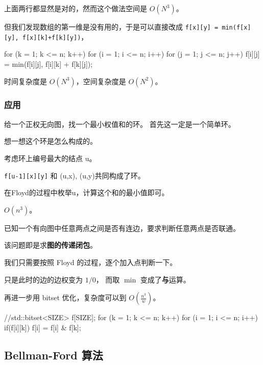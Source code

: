 上面两行都显然是对的，然而这个做法空间是 $O(N^3)$。

但我们发现数组的第一维是没有用的，于是可以直接改成 \texttt{f[x][y] = min(f[x][y], f[x][k]+f[k][y])}，

\begin{cppcode}
for (k = 1; k <= n; k++) {
  for (i = 1; i <= n; i++) {
    for (j = 1; j <= n; j++) {
      f[i][j] = min(f[i][j], f[i][k] + f[k][j]);
    }
  }
}
\end{cppcode}

时间复杂度是 $O(N^3)$，空间复杂度是 $O(N^2)$。

\subsubsection{应用}

\begin{QUESTION}{给一个正权无向图，找一个最小权值和的环。}{}
首先这一定是一个简单环。

想一想这个环是怎么构成的。

考虑环上编号最大的结点 u。

\texttt{f[u-1][x][y]} 和 (u,x), (u,y)共同构成了环。

在Floyd的过程中枚举u，计算这个和的最小值即可。

$O(n^3)$。

\end{QUESTION}


\begin{QUESTION}{已知一个有向图中任意两点之间是否有连边，要求判断任意两点是否联通。}{}

该问题即是求\textbf{图的传递闭包}。

我们只需要按照 Floyd 的过程，逐个加入点判断一下。

只是此时的边的边权变为 $1/0$， 而取 $\min$ 变成了\textbf{与}运算。

再进一步用 bitset 优化，复杂度可以到 $O(\frac{n^3}{w})$。

\begin{cppcode}
//std::bitset<SIZE> f[SIZE];
for (k = 1; k <= n; k++)
  for (i = 1; i <= n; i++)
      if(f[i][k]) f[i] = f[i] & f[k];
\end{cppcode}

\end{QUESTION}


\hr

\subsection{Bellman-Ford 算法}

